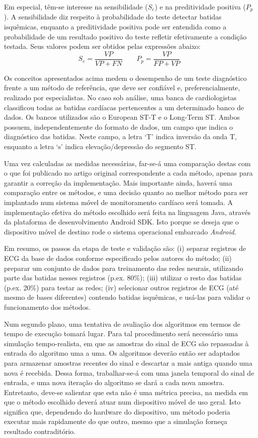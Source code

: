 Em especial, têm-se interesse na sensibilidade ($S_e$) e na preditividade positiva ($P_p$). A sensibilidade diz respeito à probabilidade do teste detectar batidas isquêmicas, enquanto a preditividade positiva pode ser entendida como a probabilidade de um resultado positivo do teste refletir efetivamente a condição testada. Seus valores podem ser obtidos pelas expressões abaixo:
\begin{equation} \label{equ:metrics}
    S_e = \frac{VP}{VP+FN}
    \quad\quad
    P_p = \frac{VP}{FP+VP}
\end{equation}

Os conceitos apresentados acima medem o desempenho de um teste diagnóstico frente a um método de referência, que deve ser confiável e, preferencialmente, realizado por especialistas. No caso sob análise, uma banca de cardiologistas classificou todas as batidas cardíacas pertencentes a um determinado banco de dados. Os bancos utilizados são o European ST-T e o Long-Term ST. Ambos possuem, independentemente do formato de dados, um campo que indica o diagnóstico das batidas. Neste campo, a letra `T' indica inversão da onda T, enquanto a letra `s' indica elevação/depressão do segmento ST.

Uma vez calculadas as medidas necessárias, far-se-á uma comparação destas com o que foi publicado no artigo original correspondente a cada método, apenas para garantir a correção da implementação. Mais importante ainda, haverá uma comparação entre os métodos, e uma decisão quanto ao melhor método para ser implantado num sistema móvel de monitoramento cardíaco será tomada. A implementação efetiva do método escolhido será feita na linguagem Java, através da plataforma de desenvolvimento Android SDK. Isto porque se deseja que o dispositivo móvel de destino rode o sistema operacional embarcado \emph{Android}.

Em resumo, os passos da etapa de teste e validação são: (i) separar registros de ECG da base de dados conforme especificado pelos autores do método; (ii) preparar um conjunto de dados para treinamento das redes neurais, utilizando parte das batidas nesses registros (p.ex. 80\%); (iii) utilizar o resto das batidas (p.ex. 20\%) para testar as redes; (iv) selecionar outros registros de ECG (até mesmo de bases diferentes) contendo batidas isquêmicas, e usá-las para validar o funcionamento dos métodos.

Num segundo plano, uma tentativa de avaliação dos algoritmos em termos de tempo de execução tomará lugar. Para tal procedimento será necessário uma simulação tempo-realista, em que as amostras do sinal de ECG são repassadas à entrada do algoritmo uma a uma. Os algoritmos deverão então ser adaptados para armazenar amostras recentes do sinal e descartar a mais antiga quando uma nova é recebida. Dessa forma, trabalhar-se-á com uma janela temporal do sinal de entrada, e uma nova iteração do algoritmo se dará a cada nova amostra. Entretanto, deve-se salientar que esta não é uma métrica precisa, na medida em que o método escolhido deverá atuar num dispositivo móvel de uso geral. Isto significa que, dependendo  do hardware do dispositivo, um método poderia executar mais rapidamente do que outro, mesmo que a simulação forneça resultado contraditório.

